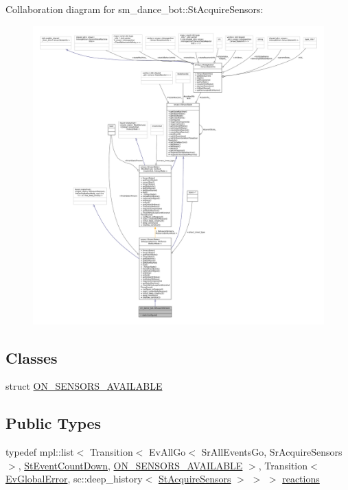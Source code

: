 Collaboration diagram for sm\+\_\+dance\+\_\+bot\+:\+:St\+Acquire\+Sensors\+:
\nopagebreak
\begin{figure}[H]
\begin{center}
\leavevmode
\includegraphics[width=350pt]{structsm__dance__bot_1_1StAcquireSensors__coll__graph}
\end{center}
\end{figure}
\subsection*{Classes}
\begin{DoxyCompactItemize}
\item 
struct \hyperlink{structsm__dance__bot_1_1StAcquireSensors_1_1ON__SENSORS__AVAILABLE}{O\+N\+\_\+\+S\+E\+N\+S\+O\+R\+S\+\_\+\+A\+V\+A\+I\+L\+A\+B\+LE}
\end{DoxyCompactItemize}
\subsection*{Public Types}
\begin{DoxyCompactItemize}
\item 
typedef mpl\+::list$<$ Transition$<$ Ev\+All\+Go$<$ Sr\+All\+Events\+Go, Sr\+Acquire\+Sensors $>$, \hyperlink{structsm__dance__bot_1_1StEventCountDown}{St\+Event\+Count\+Down}, \hyperlink{structsm__dance__bot_1_1StAcquireSensors_1_1ON__SENSORS__AVAILABLE}{O\+N\+\_\+\+S\+E\+N\+S\+O\+R\+S\+\_\+\+A\+V\+A\+I\+L\+A\+B\+LE} $>$, Transition$<$ \hyperlink{structsm__dance__bot_1_1EvGlobalError}{Ev\+Global\+Error}, sc\+::deep\+\_\+history$<$ \hyperlink{structsm__dance__bot_1_1StAcquireSensors}{St\+Acquire\+Sensors} $>$ $>$ $>$ \hyperlink{structsm__dance__bot_1_1StAcquireSensors_a575dd244650f9a08c2a30f06f570d5a3}{reactions}
\end{DoxyCompactItemize}
